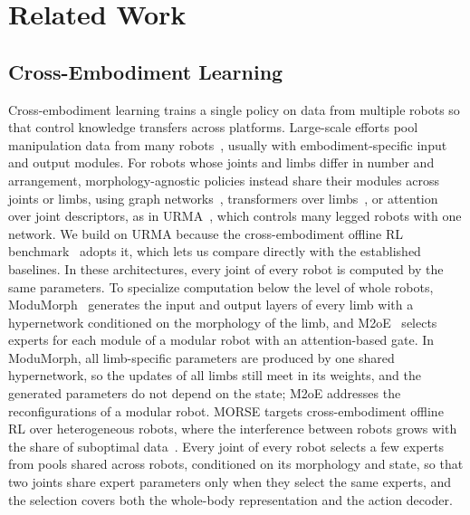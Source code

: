 \section{Related Work}
\label{sec:related}

\subsection{Cross-Embodiment Learning}
Cross-embodiment learning trains a single policy on data from multiple robots so that control knowledge transfers
across platforms. Large-scale efforts pool manipulation data from many robots~\citep{oxe2024,octo2024}, usually with
embodiment-specific input and output modules. For robots whose joints and limbs differ in number and arrangement,
morphology-agnostic policies instead share their modules across joints or limbs, using graph
networks~\citep{wang2018nervenet,huang2020smp}, transformers over limbs~\citep{kurin2021amorpheus,gupta2022metamorph},
or attention over joint descriptors, as in URMA~\citep{bohlinger2024onepolicy}, which controls many legged robots with
one network. We build on URMA because the cross-embodiment offline RL benchmark~\citep{abe2026crossembodimentoffline}
adopts it, which lets us compare directly with the established baselines. In these architectures, every joint of every
robot is computed by the same parameters. To specialize computation below the level of whole robots,
ModuMorph~\citep{xiong2023modumorph} generates the input and output layers of every limb with a hypernetwork
conditioned on the morphology of the limb, and M2oE~\citep{liu2026m2oe} selects experts for each module of a modular
robot with an attention-based gate. In ModuMorph, all limb-specific parameters are produced by one shared hypernetwork,
so the updates of all limbs still meet in its weights, and the generated parameters do not depend on the state; M2oE
addresses the reconfigurations of a modular robot. MORSE targets cross-embodiment offline RL over heterogeneous robots,
where the interference between robots grows with the share of suboptimal
data~\citep{abe2026crossembodimentoffline}. Every joint of every robot selects a few experts from pools shared across
robots, conditioned on its morphology and state, so that two joints share expert parameters only when they select the
same experts, and the selection covers both the whole-body representation and the action decoder.

